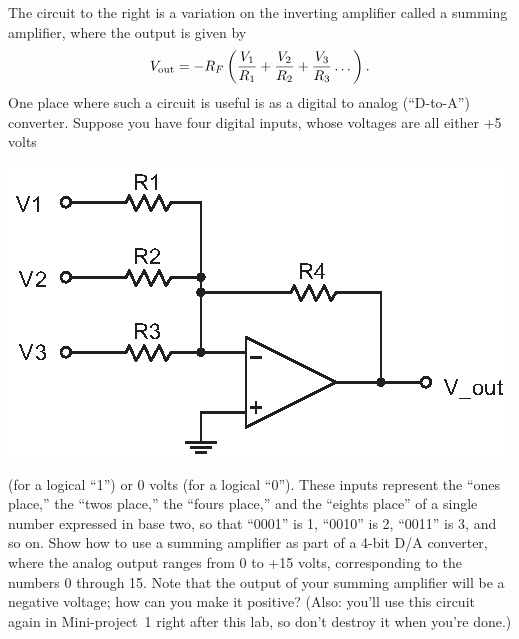 \begin{enumerate}[wide]
\bigskip

\begin{minipage}{.50\textwidth}
\item The circuit to the right is a variation on the inverting amplifier called a summing amplifier, where the output is given by \label{part_summer}
\begin{equation*}
V_{\rm out} = -R_F \left( \frac{V_1}{R_1} + \frac{V_2}{R_2} +\frac{V_3}{R_3} \dots \right).
\end{equation*}
\startsquarepar 
One place where such a circuit is useful is as a digital to analog (``D-to-A'') converter.  Suppose you have four  
digital inputs, whose voltages are all either +5 volts
\stopsquarepar
\end{minipage}
\begin{minipage}{.49\textwidth}
\begin{flushright}
\includegraphics{op-amps/summing_amp.eps}
\end{flushright}
\end{minipage}

(for a logical ``1'') or 0 volts (for a logical ``0'').  These inputs represent the ``ones place,'' the ``twos place,'' the ``fours place,'' and the ``eights place'' of a single number expressed in base two, so that ``0001'' is 1, ``0010'' is 2, ``0011'' is 3, and so on.  Show how to use a summing amplifier as part of a 4-bit D/A converter, where the analog output ranges from 0 to +15 volts, corresponding to the numbers 0 through 15.  Note that the output of your summing amplifier will be a negative voltage; how can you make it positive?  (Also: you'll use this circuit again in Mini-project~1 right after this lab, so don't destroy it when you're done.) 


\end{enumerate}
